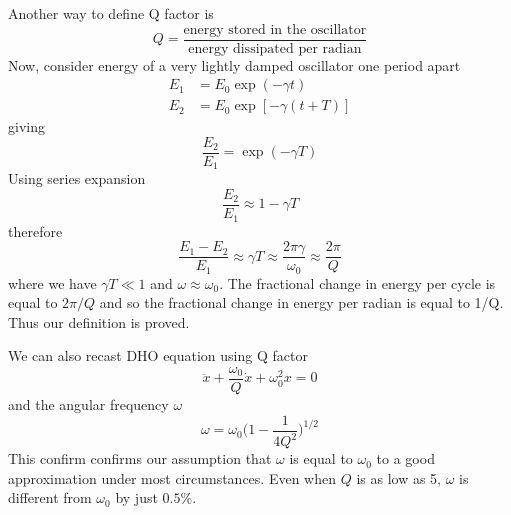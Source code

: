 \documentclass[../../../main.tex]{subfiles}
\begin{document}
Another way to define Q factor is 
\begin{equation*}
    Q=\frac{\text{energy stored in the oscillator}}{\text{energy dissipated per radian}}
\end{equation*}
Now, consider energy of a very lightly damped oscillator one period apart 
\begin{align*}
    E_1&=E_0\exp(-\gamma t) \\
    E_2&=E_0\exp[-\gamma (t+T)]
\end{align*}
giving
\begin{equation*}
    \frac{E_2}{E_1}=\exp(-\gamma T)
\end{equation*}
Using series expansion
\begin{equation*}
    \frac{E_2}{E_1}\approx1-\gamma T
\end{equation*}
therefore
\begin{equation*}
    \frac{E_1-E_2}{E_1}\approx\gamma T\approx\frac{2\pi\gamma}{\omega_0}\approx\frac{2\pi}{Q}
\end{equation*}
where we have $\gamma T\ll 1$ and $\omega\approx\omega_0$. The fractional change in energy per cycle is equal to $2\pi/Q$ and so the fractional change in energy per radian is equal to 1/Q. Thus our definition is proved.

We can also recast DHO equation using Q factor
\begin{equation*}
    \ddot{x}+\frac{\omega_0}{Q}\dot{x}+\omega_0^2x=0
\end{equation*}
and the angular frequency $\omega$
\begin{equation*}
    \omega =\omega_0\biggl(1-\frac{1}{4Q^2}\biggr)^{1/2}
\end{equation*}
This confirm confirms our assumption that $\omega$ is equal to $\omega_0$ to a good approximation under most circumstances. Even when $Q$ is as low as 5, $\omega$ is different from $\omega_0$ by just $0.5\%$.

 
\end{document}
